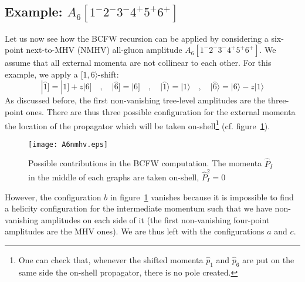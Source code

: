 \subsection{Example: $A_6[1^-2^-3^-4^+5^+6^+]$}
Let us now see how the BCFW recursion can be applied by considering a six-point next-to-MHV (NMHV) all-gluon amplitude $A_6[1^-2^-3^-4^+5^+6^+]$.
We assume that all external momenta are not collinear to each other.
For this example, we apply a $[1,6\rangle$-shift:
\begin{equation}
|\hat{1}] = |1] + z|6]
\quad,\quad
|\hat{6}] = |6]
\quad,\quad
|\hat{1}\rangle = |1\rangle
\quad,\quad
|\hat{6}\rangle = |6\rangle - z|1\rangle
\end{equation}
As discussed before, the first non-vanishing tree-level amplitudes are the three-point ones. 
There are thus three possible configuration for the external momenta \wrt the location of the propagator which will be taken on-shell\footnote{One can check that, whenever the shifted momenta $\hat{p}_1$ and $\hat{p}_6$ are put on the same side \wrt the on-shell propagator, there is no pole created.} (cf. figure~\ref{fig_A6nmhv}).
\begin{figure}[h]
  \centering
  \texttt{[image: A6nmhv.eps]}
  \caption{Possible contributions in the BCFW computation. The momenta $\hat{P}_I$ in the middle of each graphs are taken on-shell, \ie $\hat{P}_I^2=0$}
  \label{fig_A6nmhv}
\end{figure}
However, the configuration $b$ in figure~\ref{fig_A6nmhv} vanishes because it is impossible to find a helicity configuration for the intermediate momentum such that we have non-vanishing amplitudes on each side of it (the first non-vanishing four-point amplitudes are the MHV ones).
We are thus left with the configurations $a$ and $c$.
%
